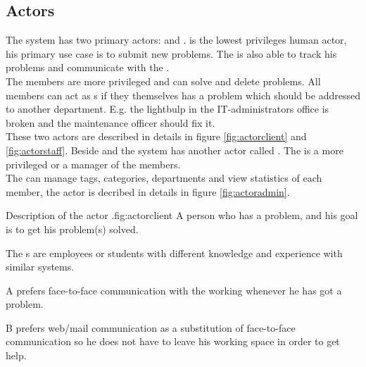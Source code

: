 \subsection{Actors}
\label{sec:actors}

The system has two primary actors:   \aclient{} and \astaff. \aclient[c] is the lowest privileges human actor, his primary use case is to submit new problems. The \aclient[] is also able to track his problems and communicate with the \astaff[]. \\

The \astaff{} members are more privileged and can solve and delete problems. 
All \astaff{} members can act as \aclient{}s if they themselves has a problem which should be addressed to another department. 
E.g. the lightbulp in the IT-administrators office is broken and the maintenance officer should fix it. \\

These two actors are described in details in figure \ref{fig:actorclient} and \ref{fig:actorstaff}. 
Beside \astaff{} and \aclient{} the system has another actor called \sadmin{}. 
The \sadmin{} is a more privileged \astaff{} or a manager of the \astaff members. \\

The \sadmin{} can manage tags, categories, departments and view statistics of each \astaff member, the actor \admin[] is decribed in details in figure \ref{fig:actoradmin}.

\begin{sadlist}[h]{\Aclient}{Description of the actor \aclient.}{fig:actorclient}
 A person who has a problem, and his goal is to get his problem(s) solved.

 The \aclient{}s are employees or students with different knowledge and experience with similar systems.%

 \Aclient{} A prefers face-to-face communication with the working \astaff{} whenever he has got a problem. 

\aclient[c] B prefers web/mail communication as a substitution of face-to-face communication so he does not have to leave his working space in order to get help. 

\end{sadlist} 


